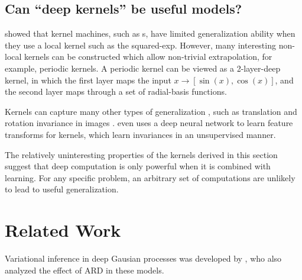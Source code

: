 \documentclass{article}
\begin{document}
\subsection{Can ``deep kernels'' be useful models?}

\cite{NIPS2005_424} showed that kernel machines, such as \gp{}s, have limited generalization ability when they use a local kernel such as the squared-exp.  However, many interesting non-local kernels can be constructed which allow non-trivial extrapolation, for example, periodic kernels. A periodic kernel can be viewed as a 2-layer-deep kernel, in which the first layer maps the input $x \rightarrow [\sin(x), \cos(x)]$, and the second layer maps through a set of radial-basis functions.  

Kernels can capture many other types of generalization
, such as translation and rotation invariance in images \cite{kondor2008group}.  \cite{SalHin08} even uses a deep neural network to learn feature transforms for kernels, which learn invariances in an unsupervised manner.  

The relatively uninteresting properties of the kernels derived in this section suggest that deep computation is only powerful when it is combined with learning.  For any specific problem, an arbitrary set of computations are unlikely to lead to useful generalization. %



\section{Related Work}

Variational inference in deep Gausian processes was developed by \cite{damianou2012deep}, who also analyzed the effect of ARD in these models.

\end{document}
